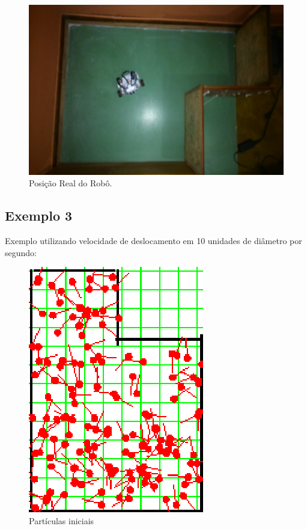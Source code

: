 \begin{figure}[H]
  \centering
  \includegraphics[scale=1]{figuras/cen3_ex2/real.eps}
  \caption[Posição Real do Robô]{Posição Real do Robô.}
  \label{img:cen3_ex2_real}
\end{figure}


\subsection{Exemplo 3}

Exemplo utilizando velocidade de deslocamento em 10 unidades de diâmetro por segundo:

\begin{figure}[H]
  \centering
  \includegraphics[scale=1]{figuras/cen3_ex3/1.eps}
  \caption[Partículas Iniciais]{Partículas iniciais}
  \label{img:cen3_ex3_1}
\end{figure}

